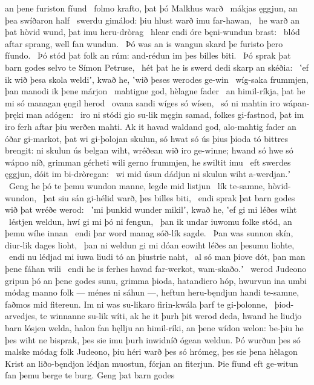 an þene furiston fíund \hld\ folmo krafto,
þat þó Malkhus warð \hld\ mákjas ęggjun,
an þea swíðaron half \hld\ swerdu gimálod:
þiu hlust warð imu far-hawan, \hld\ he warð an þat hòvid wund,
þat imu heru-dròrag \hld\ hlear endi óre
bęni-wundun brast: \hld\ blód aftar sprang,
well fan wundun. \hld\ Þó was an is wangun skard
þe furisto þero fíundo. \hld\ Þó stód þat folk an rúm:
and-rédun im þes billes biti. \hld\ Þó sprak þat barn godes
selvo te Símon Petruse, \hld\ hét þat he is swerd dedi
skarp an skéðia: \hld\ ʽef ik wið þesa skola weldiʼ, kwað he,
ʽwið þeses werodes ge-win \hld\ wíg-saka frummjen,
þan manodi ik þene márjon \hld\ mahtigne god,
hèlagne fader \hld\ an himil-ríkja,
þat he mi só managan ęngil herod \hld\ ovana sandi
wíges só wísen, \hld\ só ni mahtin iro wápan-þręki
man adógen: \hld\ iro ni stódi gio su-lik męgin samad,
folkes gi-fastnod, þat im iro ferh aftar þiu
werðen mahti. Ak it havad waldand god,
alo-mahtig fader an óðar gi-markot,
þat wi gi-þolojan skulun, só hwat só ús þius þioda tó
bittres brengit: ni skulun ús belgan wiht,
wréðean wið iro ge-winne; hwand só hwe só wápno níð,
grimman gérheti wili gerno frummjen,
he swiltit imu \hld\ eft swerdes ęggjun,
dóit im bi-dròregan: \hld\ wi mid úsun dádjun ni skulun
wiht a-werdjan.ʼ \hld\ Geng he þó te þemu wundon manne,
legde mid listjun \hld\ lík te-samne,
hòvid-wundon, \hld\ þat siu sán gi-hélid warð,
þes billes biti, \hld\ endi sprak þat barn godes
wið þat wréðe werod: \hld\ ʽmi þunkid wunder mikilʼ, kwað he,
ʽef gi mi léðes wiht \hld\ léstjen weldun,
hwí gi mi þó ni fengun, \hld\ þan ik undar iuwomu folke stód,
an þemu wíhe innan \hld\ endi þar word manag
sóð-lík sagde. \hld\ Þan was sunnon skín,
diur-lik dages lioht, \hld\ þan ni weldun gi mi dóan eowiht
léðes an þesumu liohte, \hld\ endi nu lédjad mi iuwa liudi tó
an þiustrie naht, \hld\ al só man þiove dót,
þan man þene fáhan wili \hld\ endi he is ferhes havad
far-werkot, wam-skaðo.ʼ \hld\ werod Judeono
gripun þó an þene godes sunu, grimma þioda,
hatandiero hóp, hwurvun ina umbi
módag manno folk — ménes ni sáhun —,
heftun heru-bęndjun handi te-samne,
faðmos mid fitereun. Im ni was su-likaro firin-kwála
þarf te gi-þolonne, \hld\ þiod-arvedjes,
te winnanne su-lik wíti, ak he it þurh þit werod deda,
hwand he liudjo barn lósjen welda,
halon fan hęllju an himil-ríki,
an þene wídon welon: be-þiu he þes wiht ne bisprak,
þes sie imu þurh inwidníð ógean weldun.
Þó wurðun þes só malske módag folk Judeono,
þiu héri warð þes só hrómeg, þes sie þena hèlagon Krist
an liðo-bęndjon lédjan muostun,
fórjan an fiterjun. Þie fíund eft ge-witun
fan þemu berge te burg. Geng þat barn godes
